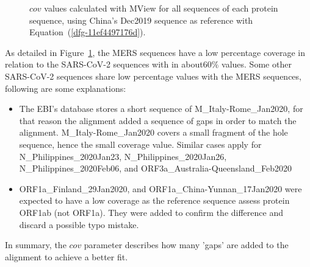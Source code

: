 \documentclass[11pt]{article}
\makeatletter
\def\fixFloatSize#1{}%
\makeatother
\begin{document}
\bgroup
\fixFloatSize{images/05631a02-fe31-456c-a8ef-417a8b0abdda-uplt_protein_vs_cov.png}
\begin{figure}[!htbp]
\centering \makeatletter{}
\makeatother 
\caption{{$cov $ values calculated with MView for all sequences of each protein sequence, using China's Dec2019 sequence as reference with Equation~(\ref{dfg-11ef4497176d}).}}
\label{f-c08c4047352a}
\end{figure}
\egroup
As detailed in Figure~\ref{f-c08c4047352a}, the MERS sequences have a low percentage coverage in relation to the SARS-CoV-2 sequences with in about$60\% $ values. Some other SARS-CoV-2 sequences share low percentage values with the MERS sequences, following are some explanations:



\begin{itemize}
  \item \relax The EBI's database stores a short sequence of M\_Italy-Rome\_Jan2020, for that reason the alignment added a sequence of gaps in order to match the alignment. M\_Italy-Rome\_Jan2020 covers a small fragment of the hole sequence, hence the small coverage value. Similar cases apply for N\_Philippines\_2020Jan23, N\_Philippines\_2020Jan26, N\_Philippines\_2020Feb06, and ORF3a\_Australia-Queensland\_Feb2020
  \item \relax ORF1a\_Finland\_29Jan2020, and ORF1a\_China-Yunnan\_17Jan2020 were expected to have a low coverage as the reference sequence assess protein ORF1ab (not ORF1a). They were added to confirm the difference and discard a possible typo mistake.
\end{itemize}
  In summary, the $cov $ parameter describes how many 'gaps' are added to the alignment to achieve a better fit.
\end{document}
